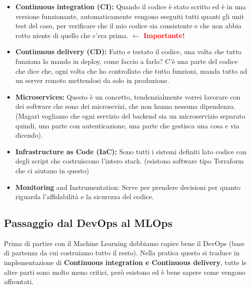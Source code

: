 \documentclass[a4paper,12pt]{article}
\begin{document}
\begin{itemize}
    \item \textbf{Continuous integration (CI): } Quando il codice è stato scritto ed è in una versione funzionante, automaticamente vengono eseguiti tutti quanti gli unit test del caso, per verificare che il mio codice sia consistente e che non abbia rotto niente di quello che c'era prima. $\leftarrow$ \textcolor{red}{\textbf{Importante!}}
    \item \textbf{Continuous delivery (CD): } Fatto e testato il codice, una volta che tutto funziona lo mando in deploy, come faccio a farlo? C'è una parte del codice che dice che, ogni volta che ho controllato che tutto funzioni, manda tutto ad un server remoto mettendosi da solo in produzione.
    \item \textbf{Microservices: } Questo è un concetto, tendenzialmente vorrei lavorare con dei software che sono dei microsevizi, che non hanno nessuna dipendenza. (Magari vogliamo che ogni servizio del backend sia un microservizio separato quindi, una parte con autenticazione, una parte che gestisca una cosa e via dicendo).
    \item \textbf{Infrastructure as Code (IaC): } Sono tutti i sistemi definiti lato codice con degli script che costruiscono l'intero stack. (esistono software tipo Terraform che ci aiutano in questo)
    \item \textbf{Monitoring } and Instrumentation: Serve per prendere decisioni per quanto riguarda l'affidabilità e la sicurezza del codice.
\end{itemize}

\subsection{Passaggio dal DevOps al MLOps}
Prima di partire con il Machine Learning dobbiamo capire bene il DevOps (base di partenza da cui costruiamo tutto il resto). 
Nella pratica questo si traduce in implementazione di \textbf{Continuous integration e Continuous delivery}, tutte le altre parti sono molto meno critici, però esistono ed è bene sapere come vengono affrontati.
\end{document}
